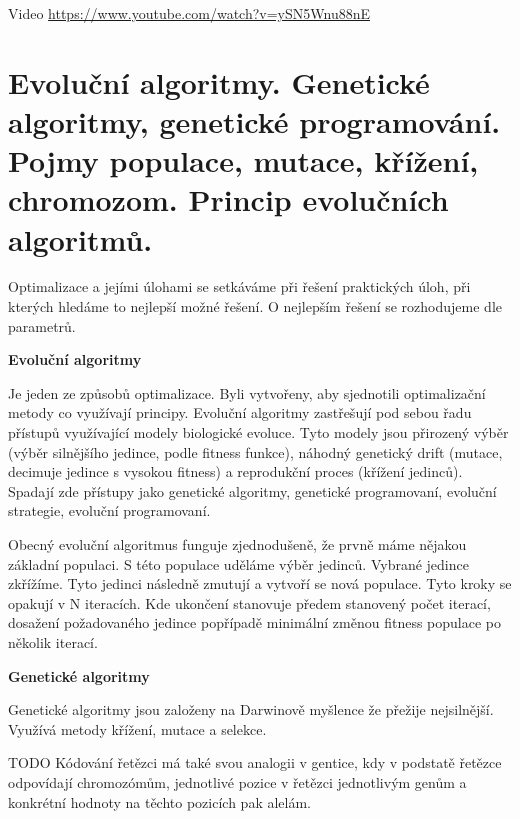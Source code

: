 Video \url{https://www.youtube.com/watch?v=ySN5Wnu88nE}







\newpage
\section{Evoluční algoritmy. Genetické algoritmy, genetické programování. Pojmy populace, mutace, křížení, chromozom. Princip evolučních algoritmů.}

Optimalizace a jejími úlohami se setkáváme při řešení praktických úloh, při kterých hledáme to nejlepší možné řešení. O nejlepším řešení se rozhodujeme dle parametrů.

\begin{Large}\vspace{0,5cm} \textbf{Evoluční algoritmy}
\end{Large}

Je jeden ze způsobů optimalizace. Byli vytvořeny, aby sjednotili optimalizační metody co využívají  principy. Evoluční algoritmy zastřešují pod sebou řadu přístupů využívající modely biologické evoluce. Tyto modely jsou přirozený výběr (výběr silnějšího jedince, podle fitness funkce), náhodný genetický drift (mutace, decimuje jedince s vysokou fitness) a reprodukční proces (křížení jedinců). Spadají zde přístupy jako genetické algoritmy, genetické programovaní, evoluční strategie, evoluční programovaní.

Obecný evoluční algoritmus funguje zjednodušeně, že prvně máme nějakou základní populaci. S této populace uděláme výběr jedinců. Vybrané jedince zkřížíme. Tyto jedinci následně zmutují a vytvoří se nová populace. Tyto kroky se opakují v N iteracích. Kde ukončení stanovuje předem stanovený počet iterací, dosažení požadovaného jedince popřípadě minimální změnou fitness populace po několik iterací.

\begin{Large}\vspace{0,5cm} \textbf{Genetické algoritmy}
\end{Large}

Genetické algoritmy jsou založeny na Darwinově myšlence že přežije nejsilnější. Využívá metody křížení, mutace a selekce.

TODO Kódování řetězci má také svou analogii v gentice, kdy v podstatě řetězce odpovídají chromozómům, jednotlivé pozice v řetězci jednotlivým genům a konkrétní hodnoty na těchto pozicích pak alelám.

